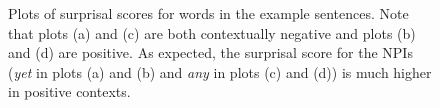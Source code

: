 \documentclass[11pt, round]{article}
\begin{document}
\begin{figure}
    \centering
    \qquad
    \caption{Plots of surprisal scores for words in the example sentences. Note that plots (a) and (c) are both contextually negative and plots (b) and (d) are positive. As expected, the surprisal score for the NPIs (\textit{yet} in plots (a) and (b) and \textit{any} in plots (c) and (d)) is much higher in positive contexts.}
    \label{fig:surprisal-basic-licensing}
\end{figure}
\end{document}
